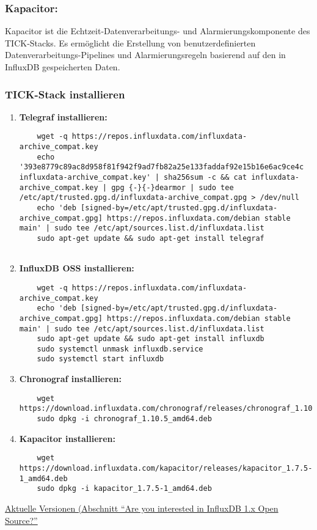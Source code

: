 \subsubsection{Kapacitor:}
Kapacitor ist die Echtzeit-Datenverarbeitungs- und Alarmierungskomponente des TICK-Stacks. Es ermöglicht die Erstellung von benutzerdefinierten Datenverarbeitungs-Pipelines und Alarmierungsregeln basierend auf den in InfluxDB gespeicherten Daten.
\newpage
\subsubsection{TICK-Stack installieren}
\begin{enumerate}
    \item \textbf{Telegraf installieren:}
    \begin{verbatim}
    wget -q https://repos.influxdata.com/influxdata-archive_compat.key
    echo '393e8779c89ac8d958f81f942f9ad7fb82a25e133faddaf92e15b16e6ac9ce4c influxdata-archive_compat.key' | sha256sum -c && cat influxdata-archive_compat.key | gpg {-}{-}dearmor | sudo tee /etc/apt/trusted.gpg.d/influxdata-archive_compat.gpg > /dev/null
    echo 'deb [signed-by=/etc/apt/trusted.gpg.d/influxdata-archive_compat.gpg] https://repos.influxdata.com/debian stable main' | sudo tee /etc/apt/sources.list.d/influxdata.list
    sudo apt-get update && sudo apt-get install telegraf
    
    \end{verbatim}
    \item \textbf{InfluxDB OSS installieren:}
    \begin{verbatim}
    wget -q https://repos.influxdata.com/influxdata-archive_compat.key
    echo 'deb [signed-by=/etc/apt/trusted.gpg.d/influxdata-archive_compat.gpg] https://repos.influxdata.com/debian stable main' | sudo tee /etc/apt/sources.list.d/influxdata.list
    sudo apt-get update && sudo apt-get install influxdb
    sudo systemctl unmask influxdb.service
    sudo systemctl start influxdb
    \end{verbatim}
    \item \textbf{Chronograf installieren:}
    \begin{verbatim}
    wget https://download.influxdata.com/chronograf/releases/chronograf_1.10.5_amd64.deb
    sudo dpkg -i chronograf_1.10.5_amd64.deb
    \end{verbatim}
    \item \textbf{Kapacitor installieren:}
    \begin{verbatim}
    wget https://download.influxdata.com/kapacitor/releases/kapacitor_1.7.5-1_amd64.deb
    sudo dpkg -i kapacitor_1.7.5-1_amd64.deb
    \end{verbatim}
\end{enumerate}
\href{https://www.influxdata.com/downloads/}{Aktuelle Versionen (Abschnitt \enquote{Are you interested in InfluxDB 1.x Open Source?}}

